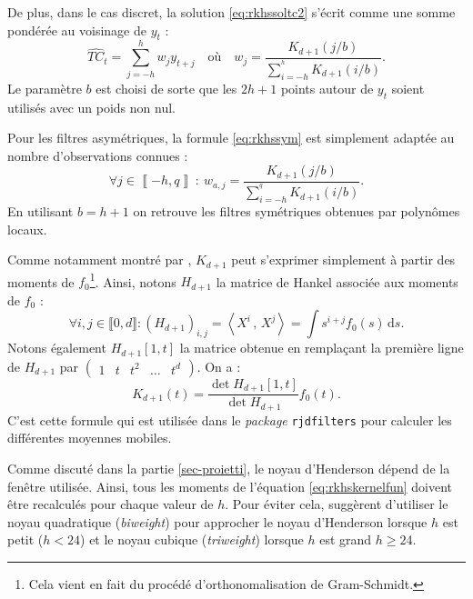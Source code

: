 \documentclass[
  12pt,
  a4paper,french]{article}
\newcommand\1{\mathds{1}}
\newcommand\ud{\,\mathrm{d}}
\newcommand{\ps}[2]{\left\langle #1 \,,\, #2 \right\rangle}
\begin{document}
De plus, dans le cas discret, la solution \eqref{eq:rkhssoltc2} s'écrit comme une somme pondérée au voisinage de \(y_t\) :
\begin{equation}
\widehat{TC}_t=\sum_{j=-h}^h w_j y_{t+j}\quad
\text{où} \quad
w_j=\frac{K_{d+1}(j/b)}{\sum_{i=-h}^{^h}K_{d+1}(i/b)}.
\label{eq:rkhssym}
\end{equation}
Le paramètre \(b\) est choisi de sorte que les \(2h+1\) points autour de \(y_t\) soient utilisés avec un poids non nul.

Pour les filtres asymétriques, la formule \eqref{eq:rkhssym} est simplement adaptée au nombre d'observations connues :
\begin{equation}
\forall j\in\left\llbracket -h,q\right\rrbracket\::\: w_{a,j}=\frac{K_{d+1}(j/b)}{\sum_{i=-h}^{^q}K_{d+1}(i/b)}.
\label{eq:rkhsasym}
\end{equation}
En utilisant \(b=h+1\) on retrouve les filtres symétriques obtenues par polynômes locaux.

Comme notamment montré par \textcite{dagumbianconcini2016seasonal}, \(K_{d+1}\) peut s'exprimer simplement à partir des moments de \(f_0\)\footnote{
  Cela vient en fait du procédé d'orthonomalisation de Gram-Schmidt.}.
Ainsi, notons \(H_{d+1}\) la matrice de Hankel associée aux moments de \(f_0\) :
\[
\forall i,j\in \llbracket 0, d\rrbracket:
\left(H_{d+1}\right)_{i,j}=\ps{X^i}{X^j}=\int s^{i+j}f_0(s)\ud s.
\]
Notons également \(H_{d+1}[1,t]\) la matrice obtenue en remplaçant la première ligne de \(H_{d+1}\) par \(\begin{pmatrix} 1 & t & t^2 & \dots & t^d\end{pmatrix}\).
On a :
\begin{equation}
K_{d+1}(t)=\frac{\det{H_{d+1}[1,t]}}{\det{H_{d+1}}}f_0(t).
\label{eq:rkhskernelfun}
\end{equation}
C'est cette formule qui est utilisée dans le \emph{package} \texttt{rjdfilters} pour calculer les différentes moyennes mobiles.

Comme discuté dans la partie \ref{sec-proietti}, le noyau d'Henderson dépend de la fenêtre utilisée.
Ainsi, tous les moments de l'équation \eqref{eq:rkhskernelfun} doivent être recalculés pour chaque valeur de \(h\).
Pour éviter cela, \textcite{dagumbianconcini2008} suggèrent d'utiliser le noyau quadratique (\emph{biweight}) pour approcher le noyau d'Henderson lorsque \(h\) est petit (\(h< 24\)) et le noyau cubique (\emph{triweight}) lorsque \(h\) est grand \(h\geq 24\).
\end{document}
